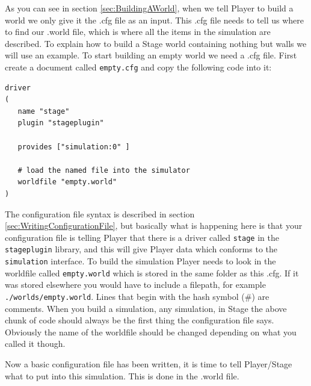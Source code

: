 \documentclass[a4paper]{report}
\newcommand{\plst}{Player/Stage\xspace}
\newcommand{\pl}{Player\xspace}
\begin{document}
As you can see in section \ref{sec:BuildingAWorld}, when we tell \pl to build a world we only give it the .cfg file as an input. This .cfg file needs to tell us where to find our .world file, which is where all the items in the simulation are described. To explain how to build a Stage world containing nothing but walls we will use an example.\newline
To start building an empty world we need a .cfg file. First create a document called \verb|empty.cfg| and copy the following code into it:
\begin{verbatim}
driver
(		
   name "stage"
   plugin "stageplugin"

   provides ["simulation:0" ]

   # load the named file into the simulator
   worldfile "empty.world"	
)
\end{verbatim}
The configuration file syntax is described in section \ref{sec:WritingConfigurationFile}, but basically what is happening here is that your configuration file is telling \pl that there is a driver called \verb|stage| in the \verb|stageplugin| library, and this will give \pl data which conforms to the \verb|simulation| interface. To build the simulation \pl needs to look in the worldfile called \verb|empty.world| which is stored in the same folder as this .cfg. If it was stored elsewhere you would have to include a filepath, for example \verb|./worlds/empty.world|. Lines that begin with the hash symbol (\#) are comments.
When you build a simulation, any simulation, in Stage the above chunk of code should always be the first thing the configuration file says. Obviously the name of the worldfile should be changed depending on what you called it though.

Now a basic configuration file has been written, it is time to tell \plst what to put into this simulation. This is done in the .world file. 
\end{document}
